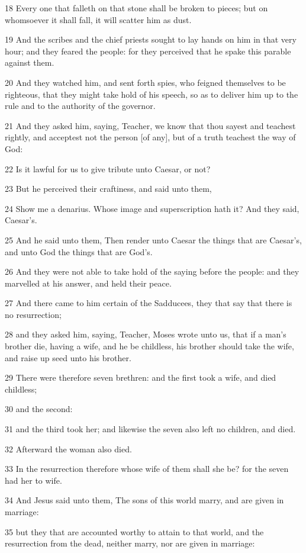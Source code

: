 \par 18 Every one that falleth on that stone shall be broken to pieces; but on whomsoever it shall fall, it will scatter him as dust.
\par 19 And the scribes and the chief priests sought to lay hands on him in that very hour; and they feared the people: for they perceived that he spake this parable against them.
\par 20 And they watched him, and sent forth spies, who feigned themselves to be righteous, that they might take hold of his speech, so as to deliver him up to the rule and to the authority of the governor.
\par 21 And they asked him, saying, Teacher, we know that thou sayest and teachest rightly, and acceptest not the person [of any], but of a truth teachest the way of God:
\par 22 Is it lawful for us to give tribute unto Caesar, or not?
\par 23 But he perceived their craftiness, and said unto them,
\par 24 Show me a denarius. Whose image and superscription hath it? And they said, Caesar's.
\par 25 And he said unto them, Then render unto Caesar the things that are Caesar's, and unto God the things that are God's.
\par 26 And they were not able to take hold of the saying before the people: and they marvelled at his answer, and held their peace.
\par 27 And there came to him certain of the Sadducees, they that say that there is no resurrection;
\par 28 and they asked him, saying, Teacher, Moses wrote unto us, that if a man's brother die, having a wife, and he be childless, his brother should take the wife, and raise up seed unto his brother.
\par 29 There were therefore seven brethren: and the first took a wife, and died childless;
\par 30 and the second:
\par 31 and the third took her; and likewise the seven also left no children, and died.
\par 32 Afterward the woman also died.
\par 33 In the resurrection therefore whose wife of them shall she be? for the seven had her to wife.
\par 34 And Jesus said unto them, The sons of this world marry, and are given in marriage:
\par 35 but they that are accounted worthy to attain to that world, and the resurrection from the dead, neither marry, nor are given in marriage:
